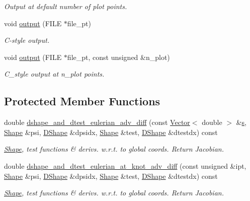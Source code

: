 \begin{DoxyCompactItemize}
\begin{DoxyCompactList}\small\item\em Output at default number of plot points. \end{DoxyCompactList}\item 
void \hyperlink{classoomph_1_1QSUPGAdvectionDiffusionElement_a57517d0b9c06ffee384f70fe587076c2}{output} (F\+I\+LE $\ast$file\+\_\+pt)
\begin{DoxyCompactList}\small\item\em C-\/style output. \end{DoxyCompactList}\item 
void \hyperlink{classoomph_1_1QSUPGAdvectionDiffusionElement_ac567806bf5318e95b1517cb80e8a3b78}{output} (F\+I\+LE $\ast$file\+\_\+pt, const unsigned \&n\+\_\+plot)
\begin{DoxyCompactList}\small\item\em C\+\_\+style output at n\+\_\+plot points. \end{DoxyCompactList}\end{DoxyCompactItemize}
\subsection*{Protected Member Functions}
\begin{DoxyCompactItemize}
\item 
double \hyperlink{classoomph_1_1QSUPGAdvectionDiffusionElement_a07f5aafc7171048c0237574bf74ab265}{dshape\+\_\+and\+\_\+dtest\+\_\+eulerian\+\_\+adv\+\_\+diff} (const \hyperlink{classoomph_1_1Vector}{Vector}$<$ double $>$ \&\hyperlink{cfortran_8h_ab7123126e4885ef647dd9c6e3807a21c}{s}, \hyperlink{classoomph_1_1Shape}{Shape} \&psi, \hyperlink{classoomph_1_1DShape}{D\+Shape} \&dpsidx, \hyperlink{classoomph_1_1Shape}{Shape} \&test, \hyperlink{classoomph_1_1DShape}{D\+Shape} \&dtestdx) const
\begin{DoxyCompactList}\small\item\em \hyperlink{classoomph_1_1Shape}{Shape}, test functions \& derivs. w.\+r.\+t. to global coords. Return Jacobian. \end{DoxyCompactList}\item 
double \hyperlink{classoomph_1_1QSUPGAdvectionDiffusionElement_af77acfc13df8c460118d2c1bfbf0d74d}{dshape\+\_\+and\+\_\+dtest\+\_\+eulerian\+\_\+at\+\_\+knot\+\_\+adv\+\_\+diff} (const unsigned \&ipt, \hyperlink{classoomph_1_1Shape}{Shape} \&psi, \hyperlink{classoomph_1_1DShape}{D\+Shape} \&dpsidx, \hyperlink{classoomph_1_1Shape}{Shape} \&test, \hyperlink{classoomph_1_1DShape}{D\+Shape} \&dtestdx) const
\begin{DoxyCompactList}\small\item\em \hyperlink{classoomph_1_1Shape}{Shape}, test functions \& derivs. w.\+r.\+t. to global coords. Return Jacobian. \end{DoxyCompactList}\end{DoxyCompactItemize}
